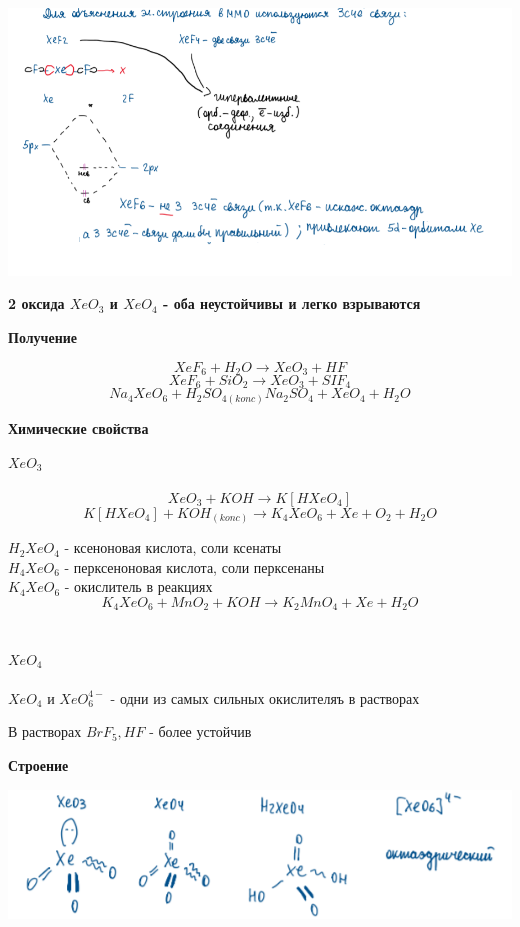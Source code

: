 \includegraphics{images/13v3.png}

\textbf{2 оксида $XeO_3$ и $XeO_4$ - оба неустойчивы и легко взрываются}

\textbf{Получение}

$$XeF_6 + H_2O \rightarrow XeO_3 + HF$$
$$XeF_6 + SiO_2 \rightarrow XeO_3 + SIF_4$$
$$Na_4XeO_6 + H_2SO_{4(konc)} Na_2SO_4 + XeO_4 + H_2O$$

\textbf{Химические свойства}

$XeO_3$\\
\\
$$XeO_3 + KOH \rightarrow K[HXeO_4]$$
$$K[HXeO_4] + KOH_{(konc)}  \rightarrow K_4XeO_6 + Xe + O_2 + H_2O$$

$H_2XeO_4$ - ксеноновая кислота, соли ксенаты\\
$H_4XeO_6$ - перксеноновая кислота, соли перксенаны\\

$K_4XeO_6$ - окислитель в реакциях\\
$$K_4XeO_6 + MnO_2 + KOH \rightarrow K_2MnO_4 + Xe + H_2O$$
\\
\\
$XeO_4$\\
\\
$XeO_4$ и $XeO_6^{4-}$ - одни из самых сильных окислителяъ в растворах

В растворах $BrF_5, HF$ - более устойчив

\textbf{Строение}

\includegraphics{images/13v4.png}

